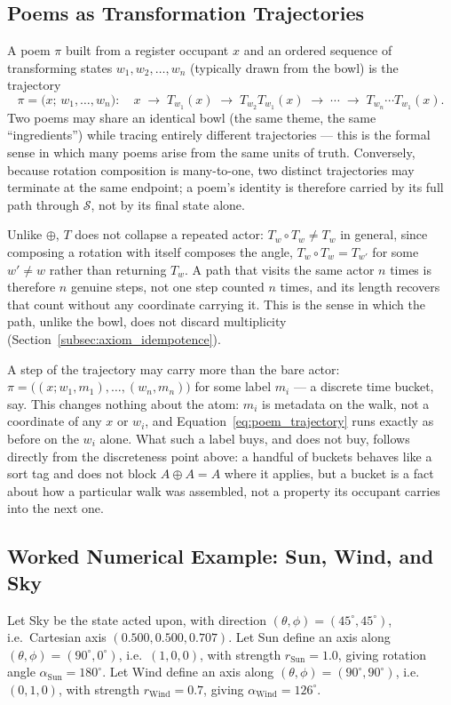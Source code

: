 \documentclass[12pt, a4paper]{article}
\begin{document}
\subsection{Poems as Transformation Trajectories}
\label{subsec:transform_trajectories}
A poem $\pi$ built from a register occupant $x$ and an ordered sequence of
transforming states $w_1, w_2, \ldots, w_n$ (typically drawn from the bowl) is the trajectory
\begin{equation}
    \pi = \big(x;\, w_1, \ldots, w_n\big): \quad
    x \;\longrightarrow\; T_{w_1}(x) \;\longrightarrow\; T_{w_2}T_{w_1}(x) \;\longrightarrow\; \cdots \;\longrightarrow\; T_{w_n}\cdots T_{w_1}(x).
    \label{eq:poem_trajectory}
\end{equation}
Two poems may share an identical bowl (the same theme, the
same ``ingredients'') while tracing entirely different trajectories
--- this is the formal sense in which many poems arise from the same
units of truth. Conversely, because rotation composition is
many-to-one, two distinct trajectories may terminate at the same
endpoint; a poem's identity is therefore carried by its full path
through $\mathcal{S}$, not by its final state alone.

Unlike $\oplus$, $T$ does not collapse a repeated actor: $T_w\circ
T_w\neq T_w$ in general, since composing a rotation with itself
composes the angle, $T_w\circ T_w = T_{w'}$ for some $w'\neq w$ rather
than returning $T_w$. A path that visits the same actor $n$ times is
therefore $n$ genuine steps, not one step counted $n$ times, and its
length recovers that count without any coordinate carrying it. This is
the sense in which the path, unlike the bowl, does not discard
multiplicity (Section~\ref{subsec:axiom_idempotence}).

A step of the trajectory may carry more than the bare actor:
$\pi=\bigl((x;w_1,m_1),\ldots,(w_n,m_n)\bigr)$ for some label $m_i$ ---
a discrete time bucket, say. This changes nothing about the atom: $m_i$
is metadata on the walk, not a coordinate of any $x$ or $w_i$, and
Equation~\eqref{eq:poem_trajectory} runs exactly as before on the
$w_i$ alone. What such a label buys, and does not buy, follows
directly from the discreteness point above: a handful of buckets
behaves like a sort tag and does not block $A\oplus A=A$ where it
applies, but a bucket is a fact about how a particular walk was
assembled, not a property its occupant carries into the next one.

\subsection{Worked Numerical Example: Sun, Wind, and Sky}
\label{subsec:transform_example}
Let Sky be the state acted upon, with direction
$(\theta,\phi) = (45^\circ, 45^\circ)$, i.e.\ Cartesian axis
$(0.500, 0.500, 0.707)$. Let Sun define an axis along
$(\theta,\phi) = (90^\circ, 0^\circ)$, i.e.\ $(1,0,0)$, with strength
$r_{\text{Sun}} = 1.0$, giving rotation angle $\alpha_{\text{Sun}} =
180^\circ$. Let Wind define an axis along $(\theta,\phi) = (90^\circ,
90^\circ)$, i.e.\ $(0,1,0)$, with strength $r_{\text{Wind}} = 0.7$,
giving $\alpha_{\text{Wind}} = 126^\circ$.
\end{document}
